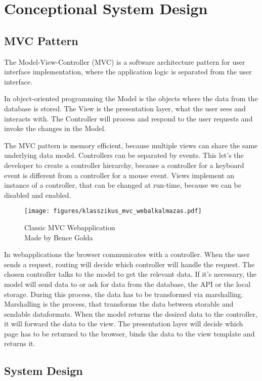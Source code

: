 \chapter{Conceptional System Design}


\section{MVC Pattern}
\label{mvc}

The Model-View-Controller (MVC) is a software architecture pattern for user interface implementation, where the application logic is separated from the user interface.

In object-oriented programming the Model is the objects where the data from the database is stored. The View is the presentation layer, what the user sees and interacts with. The Controller will process and respond to the user requests and invoke the changes in the Model. 

The MVC pattern is memory efficient, because multiple views can share the same underlying data model. Controllers can be separated by events. This let's the developer to create a controller hierarchy, because a controller for a keyboard event is different from a controller for a mouse event. Views implement an instance of a controller, that can be changed at run-time, because we can be disabled and enabled.


\begin{figure}[!ht]
	\texttt{[image: figures/klasszikus\_mvc\_webalkalmazas.pdf]}
	\caption{Classic MVC Webapplication \\ Made by Bence Golda}
	\label{fig:classic-mvc-webapplication}
\end{figure}

In webapplications the browser communicates with a controller. When the user sends a request, routing will decide which controller will handle the request. The chosen controller talks to the model to get the relevant data. If it's necessary, the model will send data to or ask for data from the database, the API or the local storage. During this process, the data has to be transformed via marshalling. Marshalling is the process, that transforms the data between storable and sendable dataformats. When the model returns the desired data to the controller, it will forward the data to the view. The presentation layer will decide which page has to be returned to the browser, binds the data to the view template and returns it.

\section{System Design}

